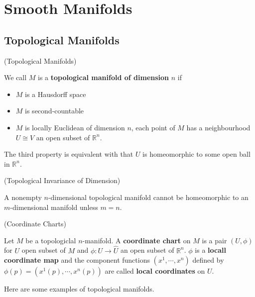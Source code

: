 \section{Smooth Manifolds}

\subsection{Topological Manifolds}

\begin{definition}(Topological Manifolds)\par
    We call $M$ is a \textbf{topological manifold of dimension}
$n$ if
\begin{itemize}
    \item $M$ is a Hausdorff space
    \item $M$ is second-countable
    \item $M$ is locally Euclidean of dimension $n$, each point of $M$ has a neighbourhood $U\cong V$ an open subset of $\mathbb{R}^n$.
\end{itemize}

\begin{proposition}
    The third property is equivalent with that $U$ is homeomorphic to some open ball in $\mathbb{R}^n$.
\end{proposition}

\begin{theorem}(Topological Invariance of Dimension)\par
    A nonempty $n$-dimensional topological manifold cannot be homeomorphic to an $m$-dimensional manifold unless $m=n$.
\end{theorem}

\begin{definition}(Coordinate Charts)\par
    Let $M$ be a topologiclal $n$-manifold. A \textbf{coordinate chart} on $M$ is a pair $(U,\phi)$ for $U$ open subset of $M$ and $\phi:U\to \hat{U}$ an open subset of $\mathbb{R}^n$. $\phi$ is a \textbf{locall coordinate map} and the component functions $(x^1,\cdots,x^n)$ defined by $\phi(p) = (x^1(p),\cdots,x^n(p))$ are called \textbf{local coordinates} on $U$.
\end{definition}

\vspace{1em} 

Here are some examples of topological manifolds.\par


\end{definition}

